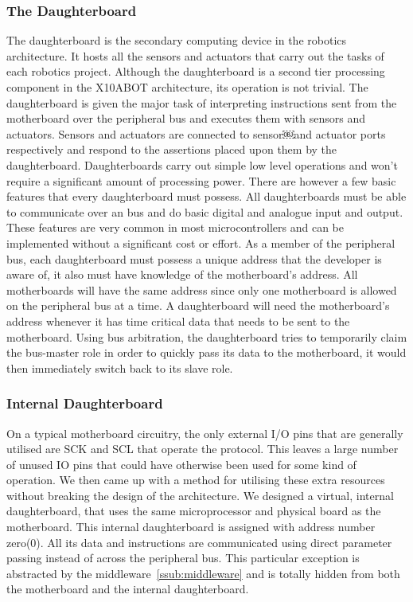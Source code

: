 	\subsubsection{The Daughterboard} %
	\label{ssub:the_daughterboard}
	The daughterboard is the secondary computing device in the \xten robotics architecture. It hosts all the sensors and actuators that carry out the tasks of each robotics project. Although the daughterboard is a second tier processing component in the X10ABOT architecture, its operation is not trivial. The daughterboard is given the major task of interpreting instructions sent from the motherboard over the peripheral bus and executes them with sensors and actuators. Sensors and actuators are connected to sensor￼and actuator ports respectively and respond to the assertions placed upon them by the daughterboard. Daughterboards carry out simple low level operations and won't require a significant amount of processing power. There are however a few basic features that every daughterboard must possess. All daughterboards must be able to communicate over an \iic bus and do basic digital and analogue input and output. These features are very common in most microcontrollers and can be implemented without a significant cost or effort.
	As a member of the peripheral bus, each daughterboard must possess a unique address that the developer is aware of, it also must have knowledge of the motherboard's address. All motherboards will have the same address since only one motherboard is allowed on the peripheral bus at a time. A daughterboard will need the motherboard's address whenever it has time critical data that needs to be sent to the motherboard. Using bus arbitration, the daughterboard tries to temporarily claim the bus-master role in order to quickly pass its data to the motherboard, it would then immediately switch back to its slave role.
	\subsubsection{Internal Daughterboard} %
	\label{ssub:internal_daughterboard}
	
	On a typical motherboard circuitry, the only external I/O pins that are generally utilised are SCK and SCL that operate the \iic protocol. This leaves a large number of unused IO pins that could have otherwise been used for some kind of operation. We then came up with a method for utilising these extra resources without breaking the design of the architecture. We designed a virtual, internal daughterboard, that uses the same microprocessor and physical board as the motherboard. This internal daughterboard is assigned with address number zero(0). All its data and instructions are communicated using direct parameter passing instead of across the peripheral bus. This particular exception is abstracted by the middleware~\ref{ssub:middleware} and is totally hidden from both the motherboard and the internal daughterboard.
	
